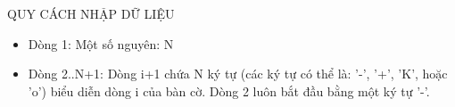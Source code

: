 QUY CÁCH NHẬP DỮ LIỆU
\begin{itemize}
	\item     Dòng 1: Một số nguyên: N   
	\item     Dòng 2..N+1: Dòng i+1 chứa N ký tự (các ký tự có thể là: '-', '+',         'K', hoặc 'o') biểu diễn dòng i của bàn cờ. Dòng 2 luôn          bắt đầu bằng một ký tự '-'.   
\end{itemize}